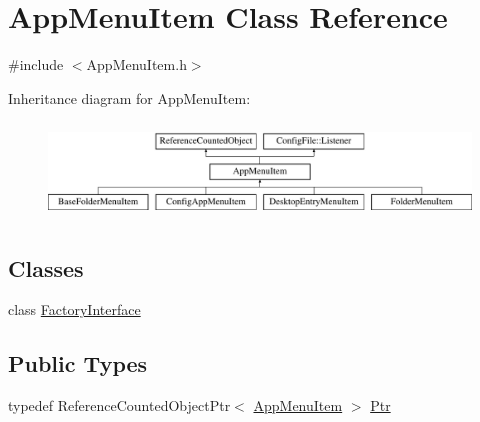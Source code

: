 \hypertarget{classAppMenuItem}{}\section{App\+Menu\+Item Class Reference}
\label{classAppMenuItem}


{\ttfamily \#include $<$App\+Menu\+Item.\+h$>$}

Inheritance diagram for App\+Menu\+Item\+:\begin{figure}[H]
\begin{center}
\leavevmode
\includegraphics[height=2.576687cm]{classAppMenuItem}
\end{center}
\end{figure}
\subsection*{Classes}
\begin{DoxyCompactItemize}
\item 
class \mbox{\hyperlink{classAppMenuItem_1_1FactoryInterface}{Factory\+Interface}}
\end{DoxyCompactItemize}
\subsection*{Public Types}
\begin{DoxyCompactItemize}
\item 
typedef Reference\+Counted\+Object\+Ptr$<$ \mbox{\hyperlink{classAppMenuItem}{App\+Menu\+Item}} $>$ \mbox{\hyperlink{classAppMenuItem_ab5f51c5d74f8df62b8862c0cc8126cb7}{Ptr}}
\end{DoxyCompactItemize}
